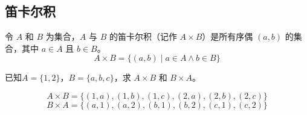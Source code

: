\subsection{笛卡尔积}
\begin{definition}[笛卡尔积]\label{def:笛卡尔积}
    令 $A$ 和 $B$ 为集合，$A$ 与 $B$ 的笛卡尔积（记作 $A \times B$）是所有序偶 $(a,b)$ 的集合，其中 $a \in A$ 且 $b \in B$。
    \begin{equation*}
        A \times B = \{(a,b) \mid a \in A \land b \in B \}
    \end{equation*}
\end{definition}

\begin{collections}
    \begin{example}
        已知$A = \{1, 2\}$，$B = \{a, b, c\}$，求 $A \times B$ 和 $B \times A$。
    \end{example}
    \begin{solution}
        $$A \times B = \{(1, a), (1, b), (1, c), (2, a), (2, b), (2, c)\}$$
        $$B \times A = \{(a, 1), (a, 2), (b, 1), (b, 2), (c, 1), (c, 2)\}$$
    \end{solution}
\end{collections}
